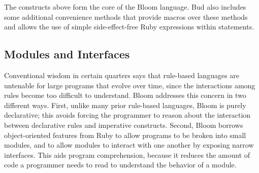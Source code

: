 The constructs above form the core of the Bloom language.
Bud also includes some additional convenience methods that provide macros over
these methods and allows the use of simple side-effect-free Ruby expressions
within statements.

\subsection{Modules and Interfaces}
\label{sec:modularity}
\begin{comment}
\jmh{More is needed here.  First, you need to introduce the use of interfaces: inputs on rhs of rules, outputs on lhs.  Two modules compose if they reference each other's interface collections in this pattern.  Note that this is local and synchronous composition at the interfaces, though a given module may itself have asynchronous or distributed behaviors inside.  Second, you need to talk about how we use Ruby's inheritance and mixin features.  This probably deserves a subsection on Modularity and Inheritance or something.}
\end{comment}

\begin{comment}
Conventional wisdom in certain quarters says that rule-based languages are
untenable for large programs that evolve over time, since the interactions among
rules become too difficult to understand.  We believe this concern is an
artifact of early rule languages that mixed apparently declarative syntax with
imperative constructs and assumptions, and which had little support for
modularity and reuse of code.
\end{comment}

Conventional wisdom in certain quarters says that rule-based languages are
untenable for large programs that evolve over time, since the interactions among
rules become too difficult to understand.  Bloom addresses this concern in two
different ways. First, unlike many prior rule-based languages, Bloom is purely
declarative; this avoids forcing the programmer to reason about the interaction
between declarative rules and imperative constructs. Second, Bloom borrows
object-oriented features from Ruby to allow programs to be broken into small
modules, and to allow modules to interact with one another by exposing narrow
interfaces. This aids program comprehension, because it reduces the amount of
code a programmer needs to read to understand the behavior of a module.

